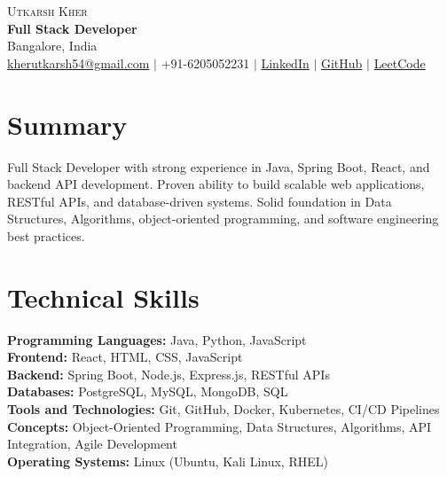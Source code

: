 \documentclass[letterpaper,10pt]{article}
\begin{document}
\begin{center}
    {\Huge \scshape Utkarsh Kher} \\ \vspace{2pt}
    \textbf{Full Stack Developer} \\ \vspace{1pt}
    Bangalore, India \\ \vspace{1pt}
    \small
    \href{mailto:kherutkarsh54@gmail.com}{kherutkarsh54@gmail.com} $|$
    +91-6205052231 $|$
    \href{https://www.linkedin.com/in/utkarsh-kher-654a1a282/}{LinkedIn} $|$
    \href{https://github.com/utkarshun}{GitHub} $|$
    \href{https://leetcode.com/u/utkarshkher/}{LeetCode}
\end{center}

\section{Summary}
\small{
Full Stack Developer with strong experience in Java, Spring Boot, React, and backend API development. Proven ability to build scalable web applications, RESTful APIs, and database-driven systems. Solid foundation in Data Structures, Algorithms, object-oriented programming, and software engineering best practices.
}

\section{Technical Skills}
\begin{itemize}[leftmargin=0.15in, label={}]
    \small{\item{
     \textbf{Programming Languages:} Java, Python, JavaScript \\
     \textbf{Frontend:} React, HTML, CSS, JavaScript \\
     \textbf{Backend:} Spring Boot, Node.js, Express.js, RESTful APIs \\
     \textbf{Databases:} PostgreSQL, MySQL, MongoDB, SQL \\
     \textbf{Tools and Technologies:} Git, GitHub, Docker, Kubernetes, CI/CD Pipelines \\
     \textbf{Concepts:} Object-Oriented Programming, Data Structures, Algorithms, API Integration, Agile Development \\
     \textbf{Operating Systems:} Linux (Ubuntu, Kali Linux, RHEL)
    }}
\end{itemize}
\end{document}
